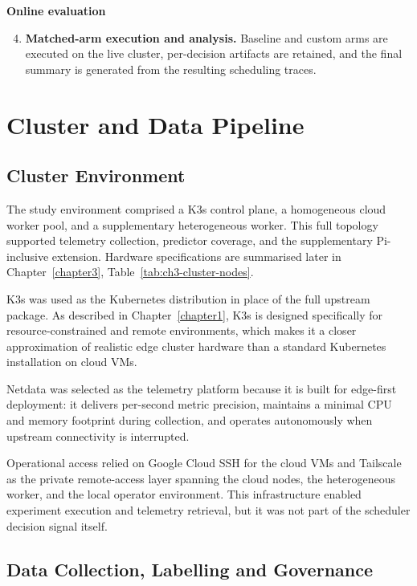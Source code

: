 \textbf{Online evaluation}
\begin{enumerate}
\setcounter{enumi}{3}
\item \textbf{Matched-arm execution and analysis.} Baseline and custom arms are executed on the live cluster, per-decision artifacts are retained, and the final summary is generated from the resulting scheduling traces.
\end{enumerate}

\section{Cluster and Data Pipeline}

\subsection{Cluster Environment}

The study environment comprised a K3s control plane, a homogeneous cloud worker pool, and a supplementary heterogeneous worker. This full topology supported telemetry collection, predictor coverage, and the supplementary Pi-inclusive extension. Hardware specifications are summarised later in Chapter~\ref{chapter3}, Table~\ref{tab:ch3-cluster-nodes}.


K3s was used as the Kubernetes distribution in place of the full upstream package. As described in Chapter~\ref{chapter1}, K3s is designed specifically for resource-constrained and remote environments, which makes it a closer approximation of realistic edge cluster hardware than a standard Kubernetes installation on cloud VMs.

Netdata was selected as the telemetry platform because it is built for edge-first deployment: it delivers per-second metric precision, maintains a minimal CPU and memory footprint during collection, and operates autonomously when upstream connectivity is interrupted.

Operational access relied on Google Cloud SSH for the cloud VMs and Tailscale as the private remote-access layer spanning the cloud nodes, the heterogeneous worker, and the local operator environment. This infrastructure enabled experiment execution and telemetry retrieval, but it was not part of the scheduler decision signal itself.

\subsection{Data Collection, Labelling and Governance}

